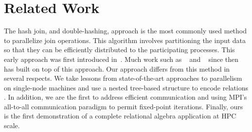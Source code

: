 
\section{Related Work}
\label{sec:related}










The hash join, and double-hashing, approach is the most commonly used method to parallelize join
operations. This algorithm involves partitioning the input data so that they can be efficiently distributed
to the participating processes. This early approach was first introduced in~\cite{Valduriez:1988:PET:54616.54618}. Much work such as ~\cite{Cheiney:1990:PST:94362.94445} and ~\cite{Cacace:1991:OPS:111828.111831} since then has built on top of this approach. Our approach differs from this method in several respects. We take lessons from state-of-the-art approaches to parallelism on single-node machines and use a nested tree-based structure to encode relations \cite{btree-ppopp,brie-pmam}. In addition, we are the first to address efficient communication and using MPI's all-to-all communication paradigm to permit fixed-point iterations. Finally, ours is the first demonstration of a complete relational algebra application at HPC scale.   

